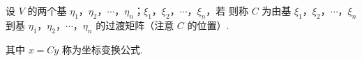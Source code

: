 

设 $V$ 的两个基 $\eta_1$，$\eta_2$，$\cdots$，$\eta_n$；$\xi_1$，$\xi_2$，$\cdots$，$\xi_n$，若
则称 $C$ 为由基 $\xi_1$，$\xi_2$，$\cdots$，$\xi_n$ 到基 $\eta_1$，$\eta_2$，$\cdots$，$\eta_n$ 的过渡矩阵（注意 $C$ 的位置）.





其中 $x=Cy$ 称为坐标变换公式.

